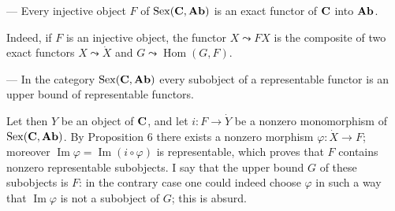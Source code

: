 \begin{corollary}
--- Every injective object $F$ of $\operatorname{Sex}(\mathbf{C},\mathbf{Ab})$ is an exact
functor of $\mathbf{C}$ into $\mathbf{Ab}$.
\end{corollary}

Indeed, if $F$ is an injective object, the functor $X\leadsto FX$ is the
composite of two exact functors $X\leadsto \dot{X}$ and
$G\leadsto \operatorname{Hom}(G,F)$.

\begin{corollary}
--- In the category $\operatorname{Sex}(\mathbf{C},\mathbf{Ab})$ every subobject of a
representable functor is an upper bound of representable functors.
\end{corollary}

Let then $Y$ be an object of $\mathbf{C}$, and let $i\colon F\to \dot{Y}$ be a
nonzero monomorphism of $\operatorname{Sex}(\mathbf{C},\mathbf{Ab})$. By Proposition 6
there exists a nonzero morphism $\varphi\colon \dot{X}\to F$; moreover
$\operatorname{Im}\varphi = \operatorname{Im}(i\circ\varphi)$ is
representable, which proves that $F$ contains nonzero representable
subobjects. I say that the upper bound $G$ of these subobjects is $F$: in
the contrary case one could indeed choose $\varphi$ in such a way that
$\operatorname{Im}\varphi$ is not a subobject of $G$; this is absurd.